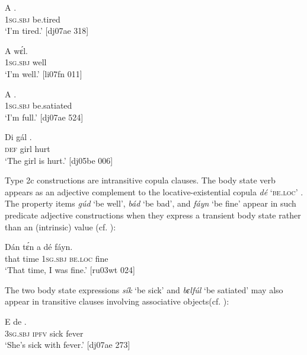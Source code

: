 \ea%
    \label{ex:key:1263}
    \gll A    .\\
\textsc{1sg.sbj}  be.tired\\

\glt ‘I’m tired.’ [dj07ae 318]
\z


\ea%
    \label{ex:key:1264}
    \gll A    wɛ́l.\\
\textsc{1sg.sbj}  well\\

\glt ‘I’m well.’ [li07fn 011]
\z


\ea%
    \label{ex:key:1265}
    \gll A    .\\
\textsc{1sg.sbj}  be.satiated\\

\glt ‘I’m full.’ [dj07ae 524]
\z


\ea%
    \label{ex:key:1266}
    \gll Di  gál  .\\
\textsc{def}  girl  hurt\\

\glt ‘The girl is hurt.’ [dj05be 006]
\z

Type 2c constructions are intransitive copula clauses. The body state verb appears as an adjective complement to the locative-existential copula \textit{dé} \textsc{‘be.loc’} . The property items \textit{gúd} ‘be well’, \textit{bád} ‘be bad’, and \textit{fáyn} ‘be fine’ appear in such predicate adjective constructions\textit{} when they express a transient body state rather than an (intrinsic) value (cf. ):


\ea%
    \label{ex:key:1267}
    \gll Dán    tɛ́n    a    dé    fáyn.\\
that    time    \textsc{1sg.sbj}  \textsc{be.loc}  fine\\
\glt ‘That time, I was fine.’   [ru03wt 024]
\z

The two body state expressions \textit{sík} ‘be sick’ and \textit{bɛlfúl} ‘be satiated’ may also appear in transitive clauses involving associative objects(cf. ):


\ea%
    \label{ex:key:1268}
    \gll E    de    .\\
\textsc{3sg.sbj}  \textsc{ipfv}  sick  fever\\

\glt ‘She’s sick with fever.’ [dj07ae 273]
\z


